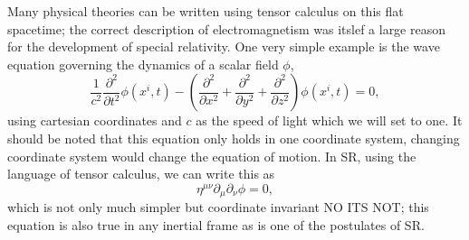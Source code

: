 Many physical theories can be written using tensor calculus on this flat spacetime; the correct description of electromagnetism was itslef a large reason for the development of special relativity. One very simple example is the wave equation governing the dynamics of a scalar field $\phi$, 
\begin{equation}
\frac{1}{c^2}\frac{\partial^2}{\partial t^2} \phi(x^i,t) - \left(\frac{\partial^2}{\partial x^2}+\frac{\partial^2}{\partial y^2}+\frac{\partial^2}{\partial z^2} \right)\phi(x^i,t)=0,
\end{equation}
using cartesian coordinates and $c$ as the speed of light which we will set to one. It should be noted that this equation only holds in one coordinate system, changing coordinate system would change the equation of motion. In SR, using the language of tensor calculus, we can write this as 
\begin{equation}
\eta^{\mu\nu}\partial_\mu\partial_\nu\phi=0\label{eq:waveeqn},
\end{equation}
which is not only much simpler but coordinate invariant NO ITS NOT; this equation is also true in any inertial frame as is one of the postulates of SR.

